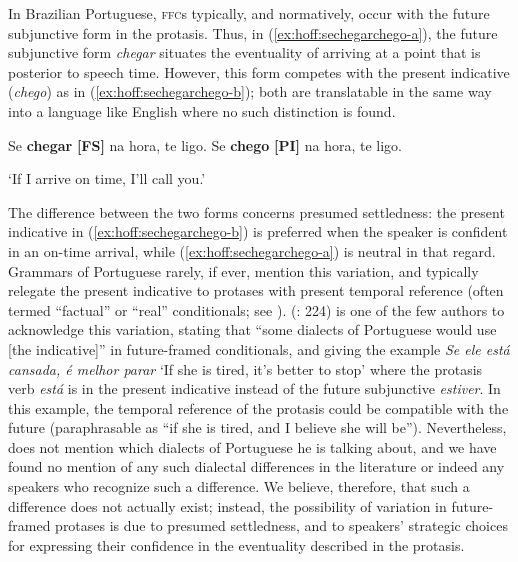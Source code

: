 \documentclass[output=paper,colorlinks,citecolor=brown]{langscibook}
\begin{document}
In Brazilian Portuguese, \textsc{ffc}s typically, and normatively, occur with the future subjunctive form in the protasis. Thus, in (\ref{ex:hoff:sechegarchego-a}), the future subjunctive form \textit{chegar} situates the eventuality of arriving at a point that is posterior to speech time. However, this form competes with the present indicative (\textit{chego}) as in (\ref{ex:hoff:sechegarchego-b}); both are translatable in the same way into a language like English where no such distinction is found. 

\begin{exe}
\ex\label{ex:hoff:sechegarchego} 
\begin{xlist}
\ex\label{ex:hoff:sechegarchego-a} Se \textbf{chegar} \textbf{[FS]} na hora, te ligo.
\ex\label{ex:hoff:sechegarchego-b} Se \textbf{chego} \textbf{[PI]} na hora, te ligo.
\end{xlist}
`If I arrive on time, I'll call you.'
\end{exe}

The difference between the two forms concerns presumed settledness: the present indicative in (\ref{ex:hoff:sechegarchego-b}) is preferred when the speaker is confident in an on-time arrival, while (\ref{ex:hoff:sechegarchego-a}) is neutral in that regard. Grammars of Portuguese rarely, if ever, mention this variation, and typically relegate the present indicative to protases with present temporal reference (often termed ``factual'' or ``real'' conditionals; see \citealt{Lobo2013}). \citeauthor{Gomes2008} (\citeyear{Gomes2008}: 224) is one of the few authors to acknowledge this variation, stating that ``some dialects of Portuguese would use [the indicative]'' in future-framed conditionals, and giving the example \textit{Se ele está cansada, é melhor parar} `If she is tired, it’s better to stop’ where the protasis verb \textit{está} is in the present indicative instead of the future subjunctive \textit{estiver}. In this example, the temporal reference of the protasis could be compatible with the future (paraphrasable as ``if she is tired, and I believe she will be''). Nevertheless, \citet{Gomes2008} does not mention which dialects of Portuguese he is talking about, and we have found no mention of any such dialectal differences in the literature or indeed any speakers who recognize such a difference. We believe, therefore, that such a difference does not actually exist; instead, the possibility of variation in future-framed protases is due to presumed settledness, and to speakers’ strategic choices for expressing their confidence in the eventuality described in the protasis. 
\end{document}
